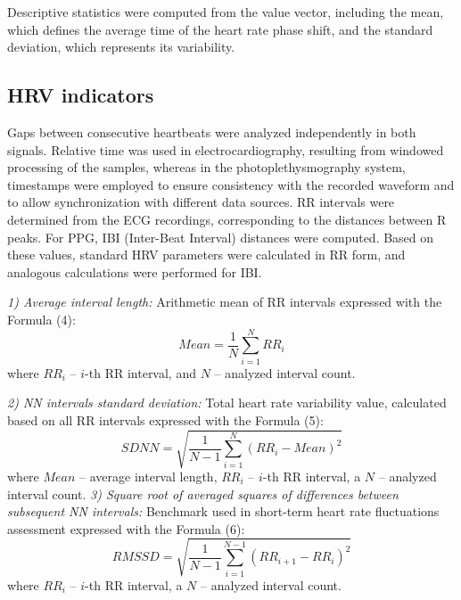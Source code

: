\documentclass[journal]{IEEEtran}
\begin{document}
Descriptive statistics were computed from the value vector, including the mean, which defines the average time of the heart rate phase shift, and the standard deviation, which represents its variability.

\subsection{HRV indicators}
Gaps between consecutive heartbeats were analyzed independently in both signals. Relative time was used in electrocardiography, resulting from windowed processing of the samples, whereas in the photoplethysmography system, timestamps were employed to ensure consistency with the recorded waveform and to allow synchronization with different data sources. RR intervals were determined from the ECG recordings, corresponding to the distances between R peaks. For PPG, IBI (Inter-Beat Interval) distances were computed. Based on these values, standard HRV parameters were calculated in RR form, and analogous calculations were performed for IBI.

\noindent\textit{1) Average interval length:} 
Arithmetic mean of RR intervals expressed with the Formula (4):
\begin{equation}
    Mean = \frac{1}{N} \sum_{i=1}^{N} RR_i
\end{equation}
where $RR_i$ -- $i$-th RR interval, and $N$ – analyzed interval count.

\noindent\textit{2) NN intervals standard deviation:} 
Total heart rate variability value, calculated based on all RR intervals expressed with the Formula (5):%
\begin{equation}
    SDNN = \sqrt{\frac{1}{N-1} \sum_{i=1}^{N} (RR_i - Mean)^2}
\end{equation}
where $Mean$ – average interval length, $RR_i$ – $i$-th RR interval, a $N$ – analyzed interval count. 
\newpage
\noindent\textit{3) Square root of averaged squares of differences between subsequent NN intervals:} 
Benchmark used in short-term heart rate fluctuations assessment expressed with the Formula (6):
\begin{equation}
    RMSSD = \sqrt{\frac{1}{N-1} \sum_{i=1}^{N-1} (RR_{i+1} - RR_i)^2}
\end{equation}
where $RR_i$ -- $i$-th RR interval, a $N$ – analyzed interval count.
\end{document}
